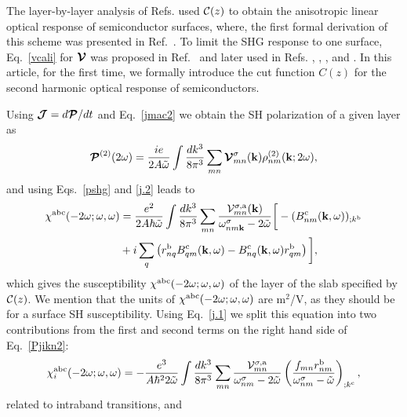 \documentclass[floatfix,prb,aps,superscriptaddress,11pt,preprint,letterpaper]{revtex4}
\def\chon{black}
\begin{document}
The layer-by-layer analysis of Refs.   
used ${\mathbf{\cal C}}(z)$
to obtain the  
anisotropic linear optical response of semiconductor surfaces, 
where, the first formal derivation  
of this scheme  
was presented in  
Ref.~. 
To limit the SHG response to one surface, Eq.~\eqref{vcali} 
for $\boldsymbol{\mathcal{\cal V}}$ was proposed in 
Ref.~ and later used in Refs.
,
,
,
 and . 
In this article, for the first time, we formally introduce the cut function $C(z)$ 
for the second harmonic optical response of semiconductors.

Using
$\boldsymbol{\mathcal{\cal J}}=d\boldsymbol{\mathcal{\cal P}}/dt$ 
and Eq.~\eqref{jmac2} 
we obtain the SH polarization of a given layer as
\begin{equation}\label{Pjikn}
\boldsymbol{\mathcal{\cal P}}^{(2)}(2\omega)
=\frac{ie}{2A\tilde\omega}
\int \frac{dk^3}{8\pi^3}
\sum_{mn}
\boldsymbol{\mathcal{\cal V}}^{\sigma}_{mn}(\mathbf{k})
\rho^{(2)}_{nm}(\mathbf{k};2\omega)
,
\end{equation}
and using Eqs.~\eqref{pshg} and \eqref{j.2} 
leads to
\begin{align}\label{Pjikn2}
\chi^{\mathrm{a}\mathrm{b}\mathrm{c}}(-2\omega;\omega,\omega) 
&=
\frac{e^2}{2A\hbar\tilde\omega}
\int \frac{dk^3}{8\pi^3}
\sum_{mn}
\frac{{\mathbf{\cal V}}^{\sigma,\mathrm{a}}_{mn}(\mathbf{k})}
{\omega^\sigma_{nm\mathbf{k}}-2\tilde\omega}
\bigg[
-(B_{nm}^{\mathrm{c}}(\mathbf{k},\omega))_{;k^{\mathrm{b}}}
\nonumber \\
&
+i\sum_q\left(r_{nq}^{\mathrm{b}}B_{qm}^{\mathrm{c}}(\mathbf{k},\omega) -
  B_{nq}^{\mathrm{c}}(\mathbf{k},\omega) 
  r_{qm}^{\mathrm{b}}\right)
\bigg]
,
\end{align}
which gives the susceptibility 
$\chi^{\mathrm{a}\mathrm{b}\mathrm{c}}(-2\omega;\omega,\omega)$ 
of the layer of the slab specified by ${\mathbf{\cal C}}(z)$. 
We mention that the units of 
$\chi^{\mathrm{a}\mathrm{b}\mathrm{c}}(-2\omega;\omega,\omega)$
are m$^2$/V, as they {\color{\chon} should be} for a surface SH susceptibility.
Using Eq.~\eqref{j.1} we
split this equation into
two contributions from the first and second terms on the right hand side
{\color{\chon} of Eq.~\eqref{Pjikn2}:}
\begin{equation}\label{chii}
\chi^{\mathrm{a}\mathrm{b}\mathrm{c}}_i (-2\omega;\omega,\omega)
=-\frac{e^3}{A\hbar^22\tilde\omega}
\int \frac{dk^3}{8\pi^3}
\sum_{mn}
\frac{{\mathbf{\cal V}}_{mn}^{\sigma,\mathrm{a}}}{\omega^\sigma_{nm}-2\tilde\omega}
\left(\frac{f_{mn}r_{nm}^{\mathrm{b}}}{\omega^\sigma_{nm}-\tilde\omega}\right)_{;k^{\mathrm{c}}}
,
\end{equation} 
{\color{\chon} related} to intraband transitions, and 
\end{document}
